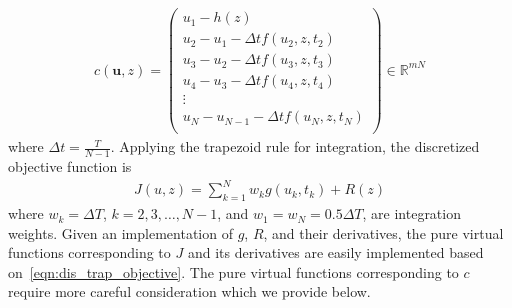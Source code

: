 \documentclass{article}
\renewcommand{\vec}[1] {\ensuremath{\boldsymbol{#1}}}
\def\R{{\mathbb R}}
\def\u{{\vec{u}}}
\begin{document}
\begin{align}
\label{eqn:back_euler}
    c(\u,z) =
    \left(\begin{array}{c}
        u_1-h(z) \\
        u_2 - u_1 - \Delta t f(u_2,z,t_2) \\
        u_3 - u_2 - \Delta t f(u_3,z,t_3) \\
        u_4 - u_3 - \Delta t f(u_4,z,t_4) \\
        \vdots \\
        u_N - u_{N-1} - \Delta t f(u_N,z,t_N) \\
    \end{array}\right) \in \R^{mN}
\end{align}
where $\Delta t = \frac{T}{N-1}$. Applying the trapezoid rule for integration, the discretized objective function is
\begin{align}
\label{eqn:dis_trap_objective}
J(u,z) = \sum\limits_{k=1}^N w_k g(u_k,t_k) + R(z)
\end{align}
where $w_k=\Delta T$, $k=2,3,\dots,N-1$, and $w_1=w_N=0.5 \Delta T$, are integration weights. Given an implementation of $g$, $R$, and their derivatives, the pure virtual functions corresponding to $J$ and its derivatives are easily implemented based on~\eqref{eqn:dis_trap_objective}. The pure virtual functions corresponding to $c$ require more careful consideration which we provide below.
\end{document}
